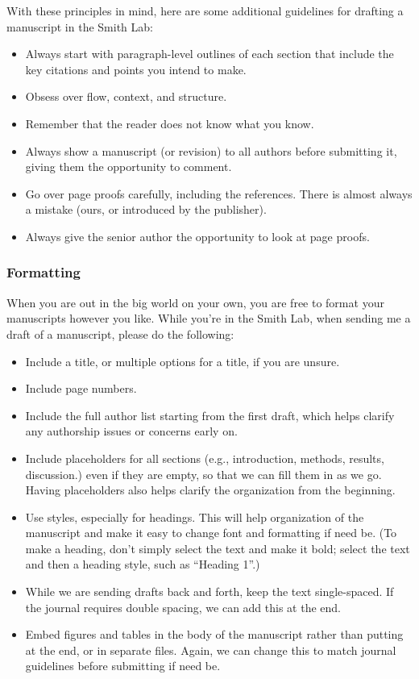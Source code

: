 \documentclass[letterpaper,12pt,oneside]{memoir}
\begin{document}
With these principles in mind, here are some additional guidelines for drafting a manuscript in the Smith Lab:

\begin{itemize}[noitemsep,nolistsep]
\item Always start with paragraph-level outlines of each section that include the key citations and points you intend to make.
\item Obsess over flow, context, and structure.
\item Remember that the reader does not know what you know.
\item Always show a manuscript (or revision) to all authors before submitting it, giving them the opportunity to comment.
\item Go over page proofs carefully, including the references. There is almost always a mistake (ours, or introduced by the publisher).
\item Always give the senior author the opportunity to look at page proofs.
\end{itemize}


\subsubsection{Formatting}

When you are out in the big world on your own, you are free to format your manuscripts however you like. While you're in the Smith Lab, when sending me a draft of a manuscript, please do the following:

\begin{itemize}[noitemsep,nolistsep]
\item Include a title, or multiple options for a title, if you are unsure. 
\item Include page numbers.
\item Include the full author list starting from the first draft, which helps clarify any authorship issues or concerns early on.
\item Include placeholders for all sections (e.g., introduction, methods, results, discussion.) even if they are empty, so that we can fill them in as we go. Having placeholders also helps clarify the organization from the beginning.
\item Use styles, especially for headings. This will help organization of the manuscript and make it easy to change font and formatting if need be. (To make a heading, don't simply select the text and make it bold; select the text and then a heading style, such as ``Heading 1''.)
\item While we are sending drafts back and forth, keep the text single-spaced. If the journal requires double spacing, we can add this at the end.
\item Embed figures and tables in the body of the manuscript rather than putting at the end, or in separate files. Again, we can change this to match journal guidelines before submitting if need be.
\end{itemize}
\end{document}
